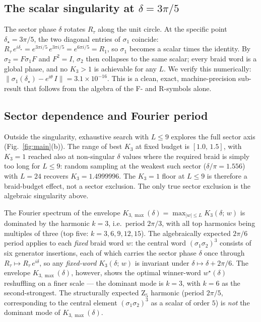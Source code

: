\documentclass[aps,prx,reprint,amsmath,amssymb,floatfix,nofootinbib,superscriptaddress]{revtex4-2}
\begin{document}
\subsection{The scalar singularity at $\delta = 3\pi/5$}

The sector phase $\delta$ rotates $R_{\tau}$ along the unit circle.
At the specific point $\delta_{\star} = 3\pi/5$, the two diagonal
entries of $\sigma_{1}$ coincide:
$R_{\tau} \, e^{i\delta_{\star}}
   = e^{3\pi i/5} \, e^{3\pi i/5}
   = e^{6\pi i/5}
   = R_{1}$,
so $\sigma_{1}$ becomes a scalar times the identity. By
$\sigma_{2} = F \sigma_{1} F$ and $F^{2} = I$, $\sigma_{2}$ then
collapses to the same scalar; every braid word is a global phase, and
no $K_{3} > 1$ is achievable for any $L$. We verify this numerically:
$\|\sigma_{1}(\delta_{\star}) - e^{i\theta}\,I\| = 3.1 \times 10^{-16}$.
This is a clean, exact, machine-precision sub-result that follows
from the algebra of the F- and R-symbols alone.

\subsection{Sector dependence and Fourier period}

Outside the singularity, exhaustive search with $L \leq 9$ explores
the full sector axis (Fig.~\ref{fig:main}(b)). The range of best
$K_{3}$ at fixed budget is $[1.0,\, 1.5]$, with $K_{3} = 1$ reached
also at non-singular $\delta$ values where the required braid is
simply too long for $L \leq 9$: random sampling at the weakest such
sector ($\delta/\pi = 1.556$) with $L = 24$ recovers $K_{3} =
1.4999996$. The $K_{3} = 1$ floor at $L \leq 9$ is therefore a
braid-budget effect, not a sector exclusion. The only true sector
exclusion is the algebraic singularity above.

The Fourier spectrum of the envelope
$K_{3,\max}(\delta) = \max_{|w| \leq L} K_{3}(\delta;\,w)$ is
dominated by the harmonic $k=3$, i.e.\ period $2\pi/3$, with all top
harmonics being multiples of three (top five: $k = 3, 6, 9, 12, 15$).
The algebraically expected $2\pi/6$ period applies to each
\emph{fixed} braid word $w$: the central word
$(\sigma_{1}\sigma_{2})^{3}$ consists of six generator insertions,
each of which carries the sector phase $\delta$ once through
$R_{\tau} \mapsto R_{\tau}\,e^{i\delta}$, so any \emph{fixed-word}
$K_{3}(\delta;\,w)$ is invariant under
$\delta \mapsto \delta + 2\pi/6$. The envelope $K_{3,\max}(\delta)$,
however, shows the optimal winner-word $w^{\star}(\delta)$
reshuffling on a finer scale --- the dominant mode is $k=3$, with
$k=6$ as the second-strongest. The structurally expected
$\mathrm{Z}_{5}$ harmonic (period $2\pi/5$, corresponding to the
central element $(\sigma_{1}\sigma_{2})^{3}$ as a scalar of order
$5$) is \emph{not} the dominant mode of $K_{3,\max}(\delta)$.
\end{document}
